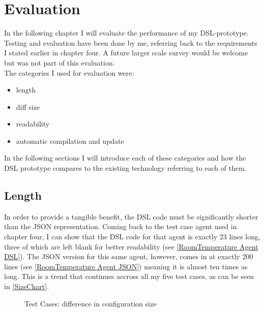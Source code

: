 \chapter{Evaluation}
In the following chapter I will evaluate the performance of my DSL-prototype.
Testing and evaluation have been done by me, referring back to the requirements I stated earlier in chapter four. A future larger scale survey would be welcome but was not part of this evaluation.\\
The categories I used for evaluation were:
\begin{itemize}
    \item length
    \item diff size
    \item readability
    \item automatic compilation and update
\end{itemize}

In the following sections I will introduce each of these categories and how the DSL prototype compares to the existing technology referring to each of them.

\section{Length}

In order to provide a tangible benefit, the DSL code must be significantly shorter than the JSON representation. Coming back to the test case agent used in chapter four, I can show that the DSL code for that agent is exactly 23 lines long, three of which are left blank for better readability (see \autoref{RoomTemperature Agent DSL}).
The JSON version for this same agent, however, comes in at exactly 200 lines (see \autoref{RoomTemperature Agent JSON}) meaning it is almost ten times as long. This is a trend that continues accross all my five test cases, as can be seen in \autoref{SizeChart}.

\begin{figure}
    \centering
    \caption{Test Cases: difference in configuration size}
    
    \label{SizeChart}
    
\end{figure}

